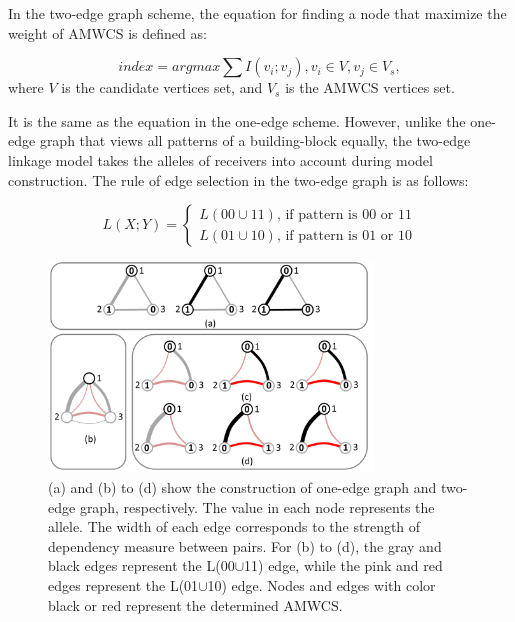 \documentclass{sig-alternate-05-2015}
\begin{document}
In the two-edge graph scheme, the equation for finding a node that maximize the weight of AMWCS is defined as:

\begin{equation} \textit{index} = argmax\sum I(v_i;v_j), {v_i\in V}, {v_j \in V_s},\end{equation}
where $V$ is the candidate vertices set, and $V_s$ is the AMWCS vertices set.

 It is the same as the equation in the  one-edge scheme. However, unlike the one-edge graph that views all patterns of a building-block equally, the two-edge linkage model takes the alleles of receivers into account during model construction. The rule of edge selection in the two-edge graph is as follows:

\begin{equation}
L(X;Y) = 
   \begin{cases}
    L(00\cup11) \text{, if pattern is 00 or 11} \\
    L(01\cup10) \text{, if pattern is 01 or 10} 
	\end{cases}
\end{equation}



\begin{figure}
\centering
\includegraphics[width=3.4in]{AMWCS}
\caption{(a)  and (b) to (d) show the construction of  one-edge graph and two-edge graph, respectively. The value in each node represents the allele. The width of each edge corresponds to the strength of dependency measure between pairs. For (b) to (d), the gray and black edges represent the L(00$\cup$11) edge, while the pink and red edges represent the L(01$\cup$10) edge. Nodes and edges with color black or red represent the determined AMWCS.}
\end{figure}
\end{document}
